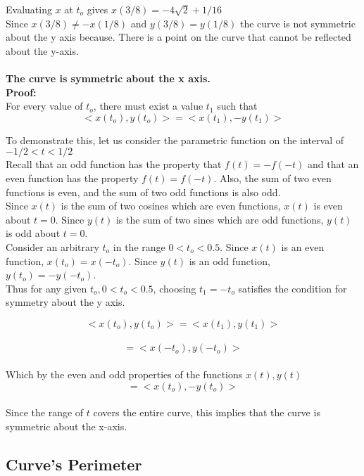 \documentclass[a4paper,10pt]{scrartcl}
\begin{document}
Evaluating $x$ at $t_o$ gives $x(3/8) = -4\sqrt{2} + 1/16$ \\

Since $x(3/8) \neq -x(1/8)$ and $y(3/8) = y(1/8)$ the curve is not symmetric about the y axis because. There is a point on the curve that
cannot be reflected about the y-axis.\\\\


{\bfseries The curve is symmetric about the x axis.}\\

{\bfseries Proof:}\\

For every value of $t_o$, there must exist a value $t_1$ such that  
\[ <x(t_o), y(t_o)> = <x(t_1), -y(t_1)>\]

To demonstrate this, let us consider the parametric function on the interval of \\$-1/2 < t < 1/2$\\

Recall that an odd function has the property that $f(t) = -f(-t)$ and that an even
function has the property $f(t) = f(-t)$. Also, the sum of two even functions is even, and the sum of
two odd functions is also odd.\\

Since $x(t)$ is the sum of two cosines which are even functions, $x(t)$ is even about $t = 0$.
Since $y(t)$ is the sum of two sines which are odd functions, $y(t)$ is odd about $t = 0$.\\

Consider an arbitrary $t_o$ in the range $0 < t_o < 0.5$. Since $x(t)$ is an even function, $x(t_o) = x(-t_o)$.
Since $y(t)$ is an odd function, $y(t_o) = -y(-t_o)$. \\

Thus for any given $t_o, 0 < t_o < 0.5$, choosing $t_1 = -t_o$ satisfies the condition for symmetry about the y axis.

\[ <x(t_o), y(t_o)> = <x(t_1), y(t_1)>\]\\
\[ = <x(-t_o), y(-t_o)>\]\\
Which by the even and odd properties of the functions $x(t), y(t)$ \\ 
\[ = <x(t_o), -y(t_o)>\]\\

Since the range of $t$ covers the entire curve, this implies that the curve is symmetric about the x-axis.
\subsection{Curve's Perimeter}
\end{document}
